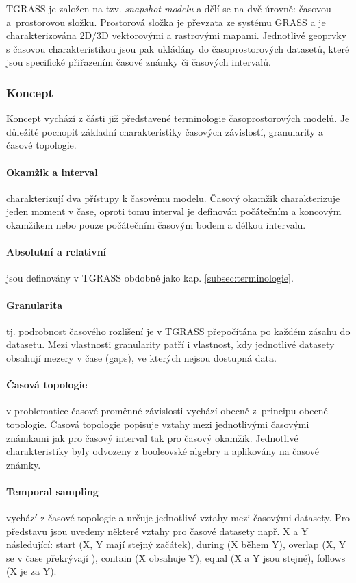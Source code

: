\documentclass[a4paper,12pt,oneside]{report}
\begin{document}
TGRASS je založen na tzv. {\em snapshot modelu} a dělí se na dvě úrovně:
časovou a~prostorovou složku. Prostorová složka je převzata ze systému GRASS a je
charakterizována 2D/3D vektorovými a rastrovými mapami. Jednotlivé
geoprvky s časovou charakteristikou jsou pak ukládány do časoprostorových
datasetů, které jsou specifické přiřazením časové známky či časových
intervalů.

\subsubsection{Koncept} 
Koncept vychází z části již představené terminologie časoprostorových
modelů. Je důležité pochopit základní charakteristiky časových závislostí,
granularity a časové topologie.

\paragraph*{Okamžik a interval} charakterizují dva přístupy k časovému
modelu.  Časový okamžik charakterizuje jeden moment v čase, oproti
tomu interval je definován počátečním  a koncovým okamžikem nebo pouze
počátečním časovým bodem a délkou intervalu.

\paragraph*{Absolutní a relativní} jsou definovány v TGRASS obdobně
jako kap. \ref{subsec:terminologie}.

\paragraph*{Granularita} tj. podrobnost časového rozlišení je v TGRASS
přepočítána po každém zásahu do datasetu. Mezi vlastnosti granularity
patří i vlastnost, kdy jednotlivé datasety obsahují mezery v čase
(gaps), ve kterých nejsou dostupná data.


\paragraph*{Časová topologie} v problematice časové proměnné
závislosti vychází obecně z~principu obecné topologie. Časová
topologie popisuje vztahy mezi jednotlivými časovými známkami jak pro
časový interval tak pro časový okamžik. Jednotlivé charakteristiky
byly odvozeny z booleovské algebry a aplikovány na časové známky.

\paragraph*{Temporal sampling} vychází z časové topologie a určuje
jednotlivé vztahy mezi časovými datasety. Pro představu jsou uvedeny
některé vztahy pro časové datasety např. X a Y následující: start
(X, Y mají stejný začátek), during (X během Y), overlap (X, Y se v
čase překrývají ), contain (X obsahuje Y), equal (X a Y jsou stejné),
follows (X je za Y).
\end{document}
